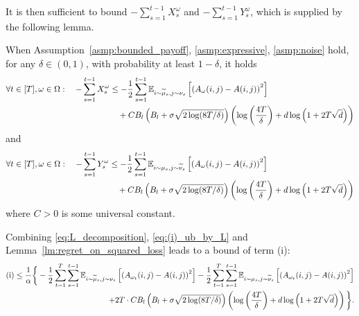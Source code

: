 It is then sufficient to bound $-\sum_{s=1}^{t-1} X_s^\omega$ and $-\sum_{s=1}^{t-1} Y_s^\omega$, which is supplied by the following lemma.  
\begin{lm}\label{lm:regret_on_squared_loss} 
When Assumption~\ref{asmp:bounded_payoff}, \ref{asmp:expressive}, \ref{asmp:noise} hold, for any $\delta \in (0,1)$, with probability at least $1-\delta$, it holds  
\begin{align}\label{eq:sum_X_bound}
    \forall t\in[T],\omega\in\Omega:\quad -\sum_{s=1}^{t-1} X_s^\omega &\leq - \frac{1}{2} \sum_{s=1}^{t-1}\mathbb{E}_{i\sim\widetilde{\mu}_s,j\sim\nu_s}\left[\left(A_\omega(i,j)-A(i,j)\right)^2\right]\notag\\
    &\quad+ C B_l\left(B_l+\sigma\sqrt{2\log(8T/\delta)}\right)  \left(\log\left(\frac{4T}{\delta}\right)+d\log\left(1+2T\sqrt{d}\right)\right) 
\end{align}
and
\begin{align}\label{eq:sum_Y_bound}
    \forall t\in[T],\omega\in\Omega:\quad -\sum_{s=1}^{t-1} Y_s^\omega &\leq - \frac{1}{2} \sum_{s=1}^{t-1}\mathbb{E}_{i\sim\mu_s,j\sim\widetilde{\nu}_s}\left[\left(A_\omega(i,j)-A(i,j)\right)^2\right]\notag\\
    &\quad+ C B_l\left(B_l+\sigma\sqrt{2\log(8T/\delta)}\right)  \left(\log\left(\frac{4T}{\delta}\right)+d\log\left(1+2T\sqrt{d}\right)\right)
\end{align}
where $C>0$ is some universal constant.
\end{lm}

Combining \eqref{eq:L_decomposition}, \eqref{eq:(i)_ub_by_L} and Lemma~\ref{lm:regret_on_squared_loss} leads to a bound of term (i):
\begin{align}\label{eq:bound_i}
    \text{(i)}\leq \frac{1}{\alpha}\bigg\{-\frac{1}{2} \sum_{t=1}^T\sum_{s=1}^{t-1}\mathbb{E}_{i\sim\widetilde{\mu}_s,j\sim\nu_s}\left[\left(A_{\omega_t}(i,j)-A(i,j)\right)^2\right]
    -  \frac{1}{2} \sum_{t=1}^T\sum_{s=1}^{t-1}\mathbb{E}_{i\sim\mu_s,j\sim\widetilde{\nu}_s}\left[\left(A_{\omega_t}(i,j)-A(i,j)\right)^2\right]\notag\\
    +2T\cdot C B_l\left(B_l+\sigma\sqrt{2\log(8T/\delta)}\right)  \left(\log\left(\frac{4T}{\delta}\right)+d\log\left(1+2T\sqrt{d}\right)\right)\bigg\}.
\end{align}

